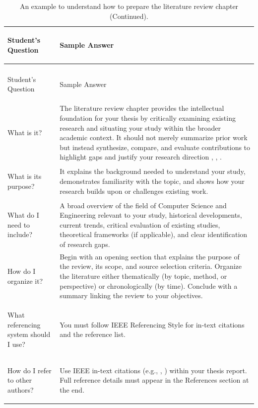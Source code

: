 \begin{xltabular}{\textwidth}{>{\bfseries\raggedright\arraybackslash}p{0.28\textwidth} >{\raggedright\arraybackslash}X}
  \caption{An example to understand how to prepare the literature review chapter.} \label{tab:lit-faq} \\
  \toprule
  Student's Question & Sample Answer \\
  \midrule
  \endfirsthead
  \caption[]{An example to understand how to prepare the literature review chapter (Continued).} \\
  \toprule
  Student's Question & Sample Answer \\
  \midrule
  \endhead
  \bottomrule
  \endfoot

  What is it? & 
  The literature review chapter provides the intellectual foundation for your thesis by critically examining existing research and situating your study within the broader academic context. It should not merely summarize prior work but instead synthesize, compare, and evaluate contributions to highlight gaps and justify your research direction \cite{hawaii2023}, \cite{cmu2022}, \cite{harvard2023}. \\
  \midrule
  
  What is its purpose? & 
  It explains the background needed to understand your study, demonstrates familiarity with the topic, and shows how your research builds upon or challenges existing work. \\
  \midrule

  What do I need to include? & 
  A broad overview of the field of Computer Science and Engineering relevant to your study, historical developments, current trends, critical evaluation of existing studies, theoretical frameworks (if applicable), and clear identification of research gaps. \\
  \midrule

  How do I organize it? & 
  Begin with an opening section that explains the purpose of the review, its scope, and source selection criteria. Organize the literature either thematically (by topic, method, or perspective) or chronologically (by time). Conclude with a summary linking the review to your objectives. \\
  \midrule

  What referencing system should I use? & 
  You must follow IEEE Referencing Style for in-text citations and the reference list. \\
  \midrule

  How do I refer to other authors? & 
  Use IEEE in-text citations (e.g., \cite{hawaii2023}, \cite{cmu2022}) within your thesis report. Full reference details must appear in the References section at the end. \\
  \midrule


\end{xltabular}
